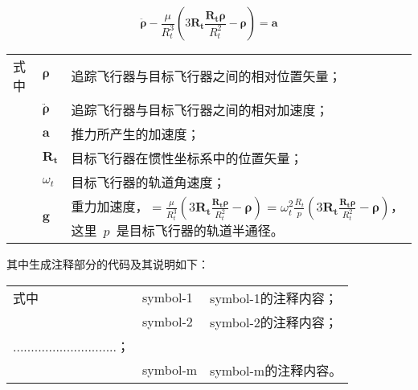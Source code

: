 \begin{equation}
\label{eq:1}
\ddot{\bm{\rho}}-\frac{\mu}{R_t^3}\left(3\bm{R_t}\frac{\bm{R_t\rho}}{R_t^2}-\bm{\rho}\right)=\bm{a}
\end{equation}
\begin{flushleft}
\renewcommand\arraystretch{1.25}
\begin{tabularx}{\textwidth}{@{}>{\normalsize\rm}l@{\quad}>{\normalsize\rm}l@{\pozhehao }>{\normalsize\rm}X@{}}
式中& $\bm{\rho}$ &追踪飞行器与目标飞行器之间的相对位置矢量；\\
&  $\ddot{\bm{\rho}}$&追踪飞行器与目标飞行器之间的相对加速度；\\
&  $\bm{a}$   &推力所产生的加速度；\\
&  $\bm{R_t}$ & 目标飞行器在惯性坐标系中的位置矢量；\\
&  $\omega_{t}$ & 目标飞行器的轨道角速度；\\
&  $\bm{g}$ & 重力加速度，$=\frac{\mu}{R_{t}^{3}}\left(
3\bm{R_{t}}\frac{\bm{R_{t}\rho}}{R_{t}^{2}}-\bm{\rho}\right)=\omega_{t}^{2}\frac{R_{t}}{p}\left(
3\bm{R_{t}}\frac{\bm{R_{t}\rho}}{R_{t}^{2}}-\bm{\rho}\right)$，这里~$p$~是目标飞行器的轨道半通径。
\end{tabularx}\vspace{.5ex}%
\end{flushleft}


其中生成注释部分的代码及其说明如下：
\begin{code}
\begin{tabularx}{\textwidth}{@{}l@{\quad}l@{\pozhehao}X@{}}
式中 & symbol-1 & symbol-1的注释内容；\\
     & symbol-2 & symbol-2的注释内容；\\
     .............................；\\
     & symbol-m & symbol-m的注释内容。
\end{tabularx}
\end{code}

